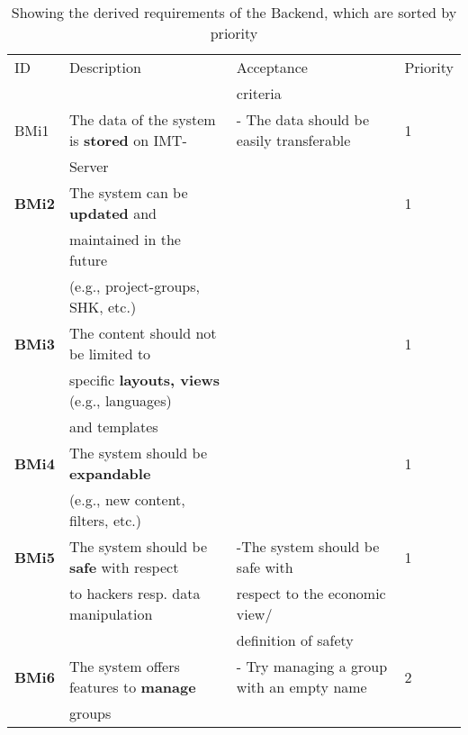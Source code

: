 \documentclass[twoside,openright,fleqn,pointlessnumbers,headinclude,,11pt,a4paper,BCOR5mm,footinclude,cleardoubleempty,abstracton %
                ]{scrreprt}
\begin{document}
	\begin{table}[h]
			\caption{Showing the derived requirements of the Backend, which are sorted by priority}
	\centering%
	\begin{tabular}{llll}
			\hline
	ID 	& Description 	& Acceptance 	& Priority \\
	 	& 			 & criteria 	&  \\
	\hline
	BMi1 & The data of the system is \textbf{stored} on IMT- 		& - The data should be easily transferable & 1	\\
	 	& Server											&  	& 		\\
	\hline
	\textbf{BMi2} & The system can be \textbf{updated} and  		&  	& 1	\\
	 	& maintained in the future							&  	& 	\\
		& (e.g., project-groups, SHK, etc.)						& 	& \\
	\hline
	\textbf{BMi3} & The content should not be limited to				&  	& 1\\
	 	& specific \textbf{layouts, views} (e.g., languages)			&	& \\
		& and templates 									&  	& \\
		\hline
	\textbf{BMi4} & The system should be \textbf{expandable} 		&  	& 1	\\
	 	& (e.g., new content, filters, etc.)						&  	& 		\\
	\hline
	\textbf{BMi5} & The system should be \textbf{safe} with respect 	& -The system should be safe with 	& 1	\\
	 	& to hackers resp. data manipulation 					&  respect to the economic view/ 	& 	\\
		&												& definition of safety			&\\
	\hline
	\textbf{BMi6} & The system offers features to \textbf{manage}  	& - Try managing a group with an empty name  & 2\\
	 	& groups 											& 	 & \\
			\hline
	\end{tabular}

	\label{RequirementsBackendMisc}
	\end{table}
\end{document}

